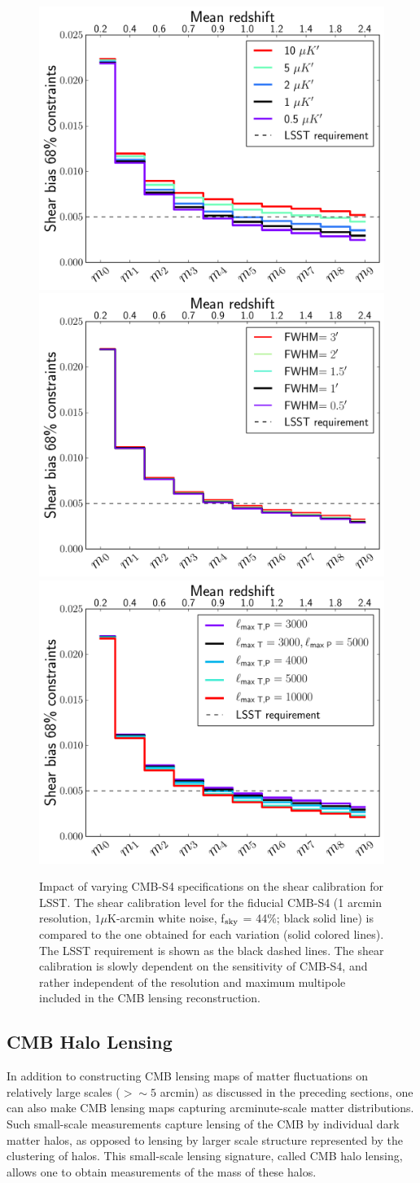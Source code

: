 \begin{figure}[htbp]
\centering
\includegraphics[width=0.32\columnwidth]{CMBLensing/LSST_varying_noise.pdf}
\includegraphics[width=0.32\columnwidth]{CMBLensing/LSST_varying_beam.pdf}
\includegraphics[width=0.32\columnwidth]{CMBLensing/LSST_varying_lmax.pdf}
\caption{Impact of varying CMB-S4 specifications on the shear calibration for LSST. The shear calibration level for the fiducial CMB-S4 (1 arcmin resolution, $1\mu$K-arcmin white noise, f$_{\rm{sky}}$ = 44\%; black solid line) is compared to the one obtained for each variation (solid colored lines). The LSST requirement is shown as the black dashed lines. The shear calibration is slowly dependent on the sensitivity of CMB-S4, and rather independent of the resolution and maximum multipole included in the CMB lensing reconstruction.}
\label{LSSTshearcalibration_vary_noise_beam_lmax}
\end{figure}



\subsection{CMB Halo Lensing}\label{haloLensing}

In addition to constructing CMB lensing maps of matter fluctuations on relatively large scales ($> \sim 5$ arcmin) as discussed in the preceding sections, one can also make CMB lensing maps capturing arcminute-scale matter distributions. Such small-scale measurements capture lensing of the CMB by individual dark matter halos, as opposed to lensing by larger scale structure represented by the clustering of halos.  This small-scale lensing signature, called CMB halo lensing, allows one to obtain measurements of the mass of these halos.  

